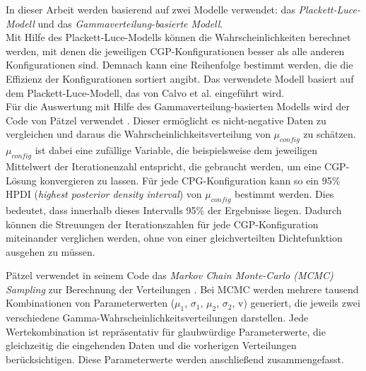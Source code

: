 In dieser Arbeit werden basierend auf \cite{cui_equidistant_2023} zwei Modelle verwendet: das \emph{Plackett-Luce-Modell} und das \emph{Gammaverteilung-basierte Modell}.\\
Mit Hilfe des Plackett-Luce-Modells können die Wahrscheinlichkeiten berechnet werden, mit denen die jeweiligen CGP-Konfigurationen besser als alle anderen Konfigurationen sind.
Demnach kann eine Reihenfolge bestimmt werden, die die Effizienz der Konfigurationen sortiert angibt.
Das verwendete Modell basiert auf dem Plackett-Luce-Modell, das von Calvo et al. eingeführt wird. \cite{cui_equidistant_2023, calvo_plackett_luce}\\
Für die Auswertung mit Hilfe des Gammaverteilung-basierten Modells wird der Code von Pätzel verwendet \cite{patzel_dpaetzelcmpbayes_2024}. 
Dieser ermöglicht es nicht-negative Daten zu vergleichen und daraus die Wahrscheinlichkeitsverteilung von $\mu_{config}$ zu schätzen.
$\mu_{config}$ ist dabei eine zufällige Variable, die beispielsweise dem jeweiligen Mittelwert der Iterationenzahl entspricht, die gebraucht werden, um eine CGP-Lösung konvergieren zu lassen.
Für jede CPG-Konfiguration kann so ein 95\% HPDI (\emph{highest posterior density interval}) von $\mu_{config}$ bestimmt werden.
Dies bedeutet, dass innerhalb dieses Intervalls 95\% der Ergebnisse liegen. \cite{cui_equidistant_2023}
Dadurch können die Streuungen der Iterationszahlen für jede CGP-Kon\-fi\-gu\-ra\-tion miteinander verglichen werden, ohne von einer gleichverteilten Dichtefunktion ausgehen zu müssen.

Pätzel verwendet in seinem Code das \emph{Markov Chain Monte-Carlo (MCMC) Sampling} zur Berechnung der Verteilungen \cite{patzel_dpaetzelcmpbayes_2024, cui_equidistant_2023}.
Bei MCMC werden mehrere tausend Kombinationen von Parameterwerten ($\mu_1$, $\sigma_1$, $\mu_2$, $\sigma_2$, v) generiert, die jeweils zwei verschiedene Gamma-Wahrscheinlichkeitsverteilungen darstellen.
Jede Wertekombination ist repräsentativ für glaubwürdige Parameterwerte, die gleichzeitig die eingehenden Daten und die vorherigen Verteilungen berücksichtigen.
Diese Parameterwerte werden anschließend zusammengefasst. \cite{kruschke_bayesian_estimation}

